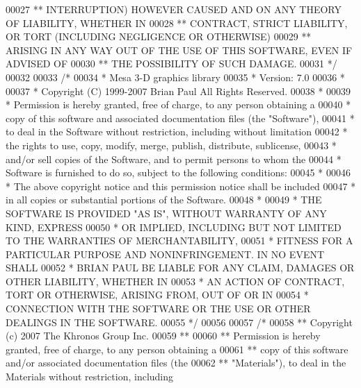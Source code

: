 \begin{DoxyCode}
00027 \textcolor{comment}{** INTERRUPTION) HOWEVER CAUSED AND ON ANY THEORY OF LIABILITY, WHETHER IN}
00028 \textcolor{comment}{** CONTRACT, STRICT LIABILITY, OR TORT (INCLUDING NEGLIGENCE OR OTHERWISE)}
00029 \textcolor{comment}{** ARISING IN ANY WAY OUT OF THE USE OF THIS SOFTWARE, EVEN IF ADVISED OF}
00030 \textcolor{comment}{** THE POSSIBILITY OF SUCH DAMAGE.}
00031 \textcolor{comment}{*/}
00032 
00033 \textcolor{comment}{/*}
00034 \textcolor{comment}{ * Mesa 3-D graphics library}
00035 \textcolor{comment}{ * Version:  7.0}
00036 \textcolor{comment}{ *}
00037 \textcolor{comment}{ * Copyright (C) 1999-2007  Brian Paul   All Rights Reserved.}
00038 \textcolor{comment}{ *}
00039 \textcolor{comment}{ * Permission is hereby granted, free of charge, to any person obtaining a}
00040 \textcolor{comment}{ * copy of this software and associated documentation files (the "Software"),}
00041 \textcolor{comment}{ * to deal in the Software without restriction, including without limitation}
00042 \textcolor{comment}{ * the rights to use, copy, modify, merge, publish, distribute, sublicense,}
00043 \textcolor{comment}{ * and/or sell copies of the Software, and to permit persons to whom the}
00044 \textcolor{comment}{ * Software is furnished to do so, subject to the following conditions:}
00045 \textcolor{comment}{ *}
00046 \textcolor{comment}{ * The above copyright notice and this permission notice shall be included}
00047 \textcolor{comment}{ * in all copies or substantial portions of the Software.}
00048 \textcolor{comment}{ *}
00049 \textcolor{comment}{ * THE SOFTWARE IS PROVIDED "AS IS", WITHOUT WARRANTY OF ANY KIND, EXPRESS}
00050 \textcolor{comment}{ * OR IMPLIED, INCLUDING BUT NOT LIMITED TO THE WARRANTIES OF MERCHANTABILITY,}
00051 \textcolor{comment}{ * FITNESS FOR A PARTICULAR PURPOSE AND NONINFRINGEMENT.  IN NO EVENT SHALL}
00052 \textcolor{comment}{ * BRIAN PAUL BE LIABLE FOR ANY CLAIM, DAMAGES OR OTHER LIABILITY, WHETHER IN}
00053 \textcolor{comment}{ * AN ACTION OF CONTRACT, TORT OR OTHERWISE, ARISING FROM, OUT OF OR IN}
00054 \textcolor{comment}{ * CONNECTION WITH THE SOFTWARE OR THE USE OR OTHER DEALINGS IN THE SOFTWARE.}
00055 \textcolor{comment}{ */}
00056 
00057 \textcolor{comment}{/*}
00058 \textcolor{comment}{** Copyright (c) 2007 The Khronos Group Inc.}
00059 \textcolor{comment}{** }
00060 \textcolor{comment}{** Permission is hereby granted, free of charge, to any person obtaining a}
00061 \textcolor{comment}{** copy of this software and/or associated documentation files (the}
00062 \textcolor{comment}{** "Materials"), to deal in the Materials without restriction, including}

\end{DoxyCode}
